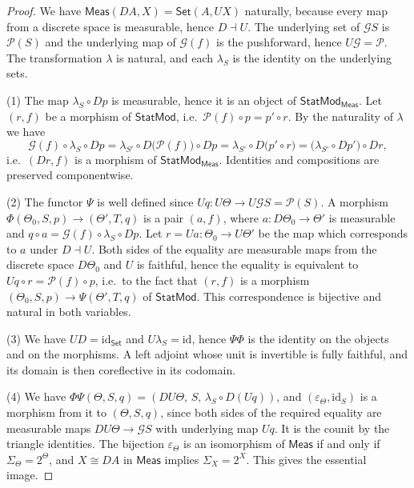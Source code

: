 \documentclass[11pt,a4paper]{article}
\theoremstyle{plain}
\theoremstyle{definition}
\theoremstyle{remark}
\newcommand{\cat}[1]{\mathsf{#1}}
\newcommand{\Meas}{\cat{Meas}}
\newcommand{\Set}{\cat{Set}}
\newcommand{\G}{\mathcal{G}}
\newcommand{\Prb}{\mathcal{P}}
\newcommand{\id}{\mathrm{id}}
\newcommand{\StatMod}{\cat{StatMod}}
\newcommand{\Statk}{\StatMod_{\Meas}}
\begin{document}
\begin{proof}
We have $\Meas(DA, X) = \Set(A, UX)$ naturally, because every map from a
discrete space is measurable, hence $D \dashv U$. The underlying set of $\G S$
is $\Prb(S)$ and the underlying map of $\G(f)$ is the pushforward, hence
$U\G = \Prb$. The transformation $\lambda$ is natural, and each $\lambda_S$ is
the identity on the underlying sets.

(1) The map $\lambda_S \circ Dp$ is measurable, hence it is an object of
$\Statk$. Let $(r,f)$ be a morphism of $\StatMod$, i.e.\
$\Prb(f)\circ p = p' \circ r$. By the naturality of $\lambda$ we have
\[
\G(f) \circ \lambda_S \circ Dp
= \lambda_{S'} \circ D\bigl(\Prb(f)\bigr) \circ Dp
= \lambda_{S'} \circ D\bigl(p' \circ r\bigr)
= \bigl(\lambda_{S'} \circ Dp'\bigr) \circ Dr ,
\]
i.e.\ $(Dr,f)$ is a morphism of $\Statk$. Identities and compositions are
preserved componentwise.

(2) The functor $\Psi$ is well defined since
$Uq \colon U\Theta \to U\G S = \Prb(S)$. A morphism
$\Phi(\Theta_0,S,p) \to (\Theta',T,q)$ is a pair $(a,f)$, where
$a \colon D\Theta_0 \to \Theta'$ is measurable and
$q \circ a = \G(f) \circ \lambda_S \circ Dp$. Let
$r = Ua \colon \Theta_0 \to U\Theta'$ be the map which corresponds to $a$ under
$D \dashv U$. Both sides of the equality are measurable maps from the discrete
space $D\Theta_0$ and $U$ is faithful, hence the equality is equivalent to
$Uq \circ r = \Prb(f) \circ p$, i.e.\ to the fact that $(r,f)$ is a morphism
$(\Theta_0,S,p) \to \Psi(\Theta',T,q)$ of $\StatMod$. This correspondence is
bijective and natural in both variables.

(3) We have $UD = \id_{\Set}$ and $U\lambda_S = \id$, hence $\Psi\Phi$ is the
identity on the objects and on the morphisms. A left adjoint whose unit is
invertible is fully faithful, and its domain is then coreflective in its
codomain.

(4) We have
$\Phi\Psi(\Theta,S,q) = (DU\Theta,\, S,\, \lambda_S \circ D(Uq))$, and
$(\varepsilon_\Theta, \id_S)$ is a morphism from it to $(\Theta,S,q)$, since
both sides of the required equality are measurable maps $DU\Theta \to \G S$
with underlying map $Uq$. It is the counit by the triangle identities. The
bijection $\varepsilon_\Theta$ is an isomorphism of $\Meas$ if and only if
$\Sigma_\Theta = 2^{\Theta}$, and $X \cong DA$ in $\Meas$ implies
$\Sigma_X = 2^X$. This gives the essential image.
\end{proof}
\end{document}

